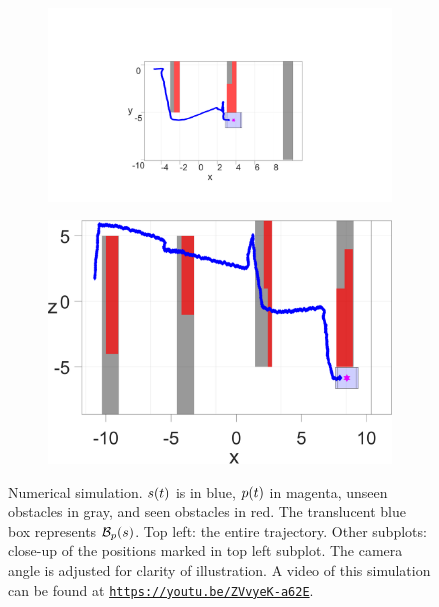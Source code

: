 \begin{figure}
	\begin{subfigure}[t]{0.49\columnwidth} \label{subfig:sim_2}
		\includegraphics[width=\columnwidth]{fig/763}
		\caption{}
	\end{subfigure}  
	\begin{subfigure}[t]{0.49\columnwidth} \label{subfig:sim_3}
		\includegraphics[width=\columnwidth]{fig/1042}
		\caption{}
	\end{subfigure}
	\caption{Numerical simulation. $s(t)$ is in blue, $p(t)$ in magenta, unseen obstacles in gray, and seen obstacles in red. The translucent blue box represents $\mathcal B_p(s)$. Top left: the entire trajectory. Other subplots: close-up of the positions marked in top left subplot. The camera angle is adjusted for clarity of illustration. A video of this simulation can be found at 
		{\tt\href{https://youtu.be/ZVvyeK-a62E}{\nolinkurl{https://youtu.be/ZVvyeK-a62E}}}.
		\label{fig:sim}}
\end{figure}

